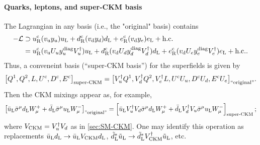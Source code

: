 \documentclass[CheatSheet]{subfiles}
\begin{document}
\paragraph{Quarks, leptons, and super-CKM basis}
The Lagrangian in any basis (i.e., the "original" basis) contains
\begin{align}
 -\mathcal L&\supset
   \uR^\cc (\vu \yu)\uL
  +\dR^\cc (\vd \yd)\dL
  +\eR^\cc (\vd \ye)\eL + \text{h.c.}
 \\
&=
   \uR^\cc (\vu U_u \yu^{\mathrm{diag}} V_u^\dagger)\uL
  +\dR^\cc (\vd U_d \yd^{\mathrm{diag}} V_d^\dagger)\dL
  +\eR^\cc (\vd U_e \ye^{\mathrm{diag}} V_e^\dagger)\eL + \text{h.c.}.
\end{align}
Thus, a conveneint basis (``super-CKM basis'') for the superfields is given by
\begin{equation}
 \bigl[
 Q^1, Q^2, L, U^{\mathrm{c}}, D^{\mathrm{c}}, E^{\mathrm{c}}
\bigr]_{\text{super-CKM}} =
 \bigl[
 V_u^\dagger Q^1, V_d^\dagger Q^2, V_e^\dagger L, U^{\mathrm{c}} U_u, D^{\mathrm{c}} U_d, E^{\mathrm{c}} U_e
\bigr]_{\text{``original''}}.
\end{equation}
Then the CKM mixings appear as, for example,
\begin{equation}
 \left[\bar u_{\mathrm{L}}\bar\sigma^\mu d_{\mathrm{L}} W^+_\mu + \bar d_{\mathrm{L}}\bar\sigma^\mu u_{\mathrm{L}} W^-_\mu\right]_{\text{''original''}}
=
 \left[\bar u_{\mathrm{L}} V_u^\dagger V_d \bar\sigma^\mu d_{\mathrm{L}} W^+_\mu + \bar d_{\mathrm{L}} V_d^\dagger V_u\bar\sigma^\mu u_{\mathrm{L}} W^-_\mu\right]_{\text{super-CKM}};
\end{equation}
where $V\w{CKM} = V_u^\dagger V_d$ as in \cref{sec:SM-CKM}.
One may identify this operation as replacements $\buL\dL\to \buL V\w{CKM}\dL$, $\tdL^*\tuL\to \tdL^* V^\dagger\w{CKM}\tuL$, etc.
\end{document}
